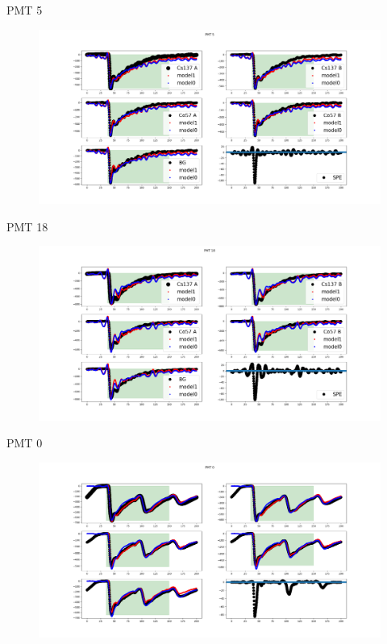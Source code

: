 \documentclass{beamer}
\begin{document}
\begin{frame}{PMT 5}
\begin{figure}
\centering
  \includegraphics[width=\linewidth]{wf5.png}
\end{figure}
\end{frame}

\begin{frame}{PMT 18}
\begin{figure}[H]
  \includegraphics[width=\linewidth]{wf18.png}
\end{figure}
\end{frame}

\begin{frame}{PMT 0}
\begin{figure}[H]
  \includegraphics[width=\linewidth]{wf0.png}
\end{figure}
\end{frame}
\end{document}
